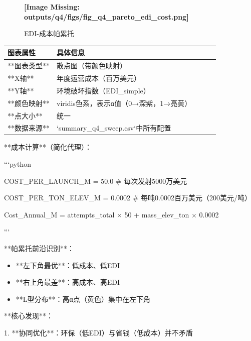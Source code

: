 \documentclass[a4paper,12pt]{article}
\begin{document}
\par
\begin{figure}[h!]
\centering
\textbf{[Image Missing: outputs/q4/figs/fig_q4_pareto_edi_cost.png]}
\caption{EDI-成本帕累托}
\end{figure}
\begin{center}
\begin{longtable}{|l|l|l|l|l|}
\hline
图表属性 & 具体信息 \\ \hline
**图表类型** & 散点图（带颜色映射） \\ \hline
**X轴** & 年度运营成本（百万美元） \\ \hline
**Y轴** & 环境破坏指数（EDI_simple） \\ \hline
**颜色映射** & viridis色系，表示α值（0→深紫，1→亮黄） \\ \hline
**点大小** & 统一 \\ \hline
**数据来源** & `summary_q4_sweep.csv`中所有配置 \\ \hline
\end{longtable}
\end{center}
**成本计算**（简化代理）：

\par
```python

\par
COST\_PER\_LAUNCH\_M = 50.0  # 每次发射5000万美元

\par
COST\_PER\_TON\_ELEV\_M = 0.0002  # 每吨0.0002百万美元（200美元/吨）

\par
Cost\_Annual\_M = attempts\_total × 50 + mass\_elev\_ton × 0.0002

\par
```

\par
**帕累托前沿识别**：

\par
\begin{itemize}
\item **左下角最优**：低成本、低EDI
\end{itemize}
\begin{itemize}
\item **右上角最差**：高成本、高EDI
\end{itemize}
\begin{itemize}
\item **L型分布**：高α点（黄色）集中在左下角
\end{itemize}
**核心发现**：

\par
1. **协同优化**：环保（低EDI）与省钱（低成本）并不矛盾
\end{document}

